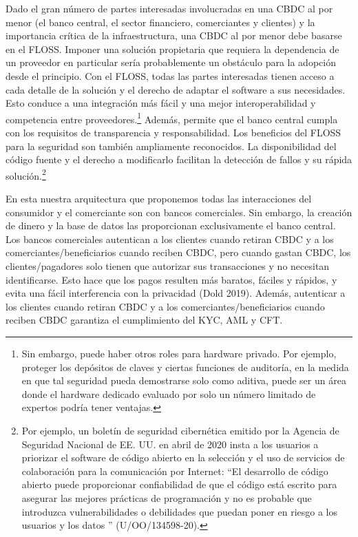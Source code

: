 \documentclass[10pt,spanish]{article}
\begin{document}
Dado el gran número de partes interesadas involucradas en una CBDC al
por menor (el banco central, el sector financiero, comerciantes y
clientes) y la importancia crítica de la infraestructura, una CBDC al
por menor debe basarse en el FLOSS. Imponer una solución propietaria que
requiera la dependencia de un proveedor en particular sería
probablemente un obstáculo para la adopción desde el principio. Con el
FLOSS, todas las partes interesadas tienen acceso a cada detalle de la
solución y el derecho de adaptar el software a sus necesidades. Esto
conduce a una integración más fácil y una mejor interoperabilidad y
competencia entre proveedores.\footnote{Sin embargo, puede haber otros
roles para hardware privado. Por ejemplo, proteger los depósitos de
claves y ciertas funciones de auditoría, en la medida en que tal
seguridad pueda demostrarse solo como aditiva, puede ser un área donde
el hardware dedicado evaluado por solo un número limitado de expertos
podría tener ventajas.} Además, permite que el banco central cumpla
con los requisitos de transparencia y responsabilidad. Los beneficios
del FLOSS para la seguridad son también ampliamente reconocidos. La
disponibilidad del código fuente y el derecho a modificarlo facilitan la
detección de fallos y su rápida solución.\footnote{Por ejemplo, un
boletín de seguridad cibernética emitido por la Agencia de Seguridad
Nacional de EE. UU. en abril de 2020 insta a los usuarios a priorizar
el software de código abierto en la selección y el uso de servicios de
colaboración para la comunicación por Internet: ``El desarrollo de
código abierto puede proporcionar confiabilidad de que el código está
escrito para asegurar las mejores prácticas de programación y no es
probable que introduzca vulnerabilidades o debilidades que puedan
poner en riesgo a los usuarios y los datos '' (U/OO/134598-20).}

En esta nuestra arquitectura que proponemos todas las interacciones del
consumidor y el comerciante son con bancos comerciales. Sin embargo, la
creación de dinero y la base de datos las proporcionan exclusivamente el
banco central. Los bancos comerciales autentican a los clientes cuando
retiran CBDC y a los comerciantes/beneficiarios cuando reciben CBDC,
pero cuando gastan CBDC, los clientes/pagadores solo tienen que
autorizar sus transacciones y no necesitan identificarse. Esto hace que
los pagos resulten más baratos, fáciles y rápidos, y evita una fácil
interferencia con la privacidad (Dold 2019). Además, autenticar a los
clientes cuando retiran CBDC y a los comerciantes/beneficiarios cuando
reciben CBDC garantiza el cumplimiento del KYC, AML y CFT.
\end{document}
